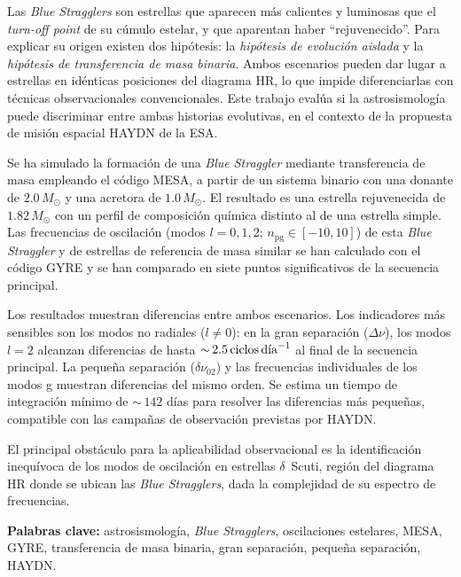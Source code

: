 Las \textit{Blue Stragglers} son estrellas que aparecen más calientes y luminosas que el \textit{turn-off point} de su cúmulo estelar, y que aparentan haber ``rejuvenecido''. Para explicar su origen existen dos hipótesis: la \textit{hipótesis de evolución aislada} y la \textit{hipótesis de transferencia de masa binaria}. Ambos escenarios pueden dar lugar a estrellas en idénticas posiciones del diagrama HR, lo que impide diferenciarlas con técnicas observacionales convencionales. Este trabajo evalúa si la astrosismología puede discriminar entre ambas historias evolutivas, en el contexto de la propuesta de misión espacial HAYDN de la ESA.

Se ha simulado la formación de una \textit{Blue Straggler} mediante transferencia de masa empleando el código MESA, a partir de un sistema binario con una donante de $2.0\,M_\odot$ y una acretora de $1.0\,M_\odot$. El resultado es una estrella rejuvenecida de $1.82\,M_\odot$ con un perfil de composición química distinto al de una estrella simple. Las frecuencias de oscilación (modos $l=0,1,2$; $n_{\mathrm{pg}} \in [-10,10]$) de esta \textit{Blue Straggler} y de estrellas de referencia de masa similar se han calculado con el código GYRE y se han comparado en siete puntos significativos de la secuencia principal.

Los resultados muestran diferencias entre ambos escenarios. Los indicadores más sensibles son los modos no radiales ($l\neq0$): en la gran separación ($\Delta\nu$), los modos $l=2$ alcanzan diferencias de hasta ${\sim}\,2.5\,\text{ciclos\,día}^{-1}$ al final de la secuencia principal. La pequeña separación ($\delta\nu_{02}$) y las frecuencias individuales de los modos g muestran diferencias del mismo orden. Se estima un tiempo de integración mínimo de ${\sim}\,142$ días para resolver las diferencias más pequeñas, compatible con las campañas de observación previstas por HAYDN.

El principal obstáculo para la aplicabilidad observacional es la identificación inequívoca de los modos de oscilación en estrellas $\delta$~Scuti, región del diagrama HR donde se ubican las \textit{Blue Stragglers}, dada la complejidad de su espectro de frecuencias.

\bigskip
\noindent\textbf{Palabras clave:} astrosismología, \textit{Blue Stragglers}, oscilaciones estelares, MESA, GYRE, transferencia de masa binaria, gran separación, pequeña separación, HAYDN.
